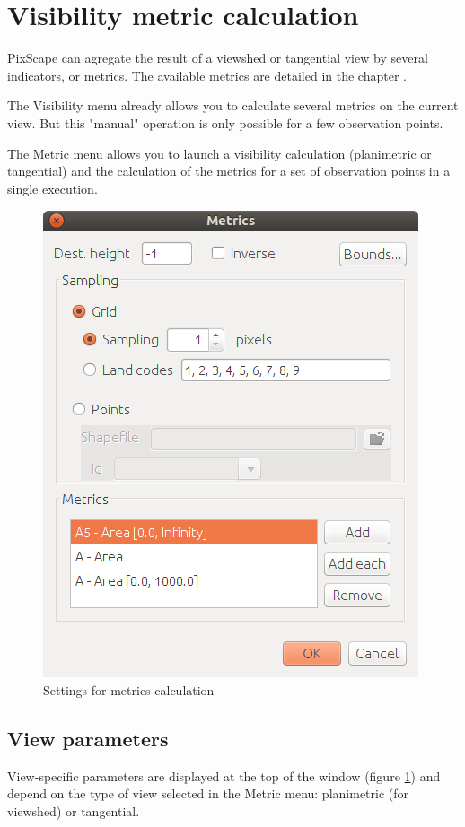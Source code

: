 \documentclass{report}
\begin{document}
\section{Visibility metric calculation}
\label{calc_metrics}
PixScape can agregate the result of a viewshed or tangential view by several indicators, or metrics. The available metrics are detailed in the chapter .

The Visibility menu already allows you to calculate several metrics on the current view. But this "manual" operation is only possible for a few observation points.

The Metric menu allows you to launch a visibility calculation (planimetric or tangential) and the calculation of the metrics for a set of observation points in a single execution.


\begin{figure}[H]
	\includegraphics[scale=0.5]{img/metrics-en.png} 
	\caption{Settings for metrics calculation}
	\label{metrics_dlg}
\end{figure}

\subsection{View parameters}
View-specific parameters are displayed at the top of the window (figure \ref{metrics_dlg}) and depend on the type of view selected in the Metric menu: planimetric (for viewshed) or tangential.
\end{document}
